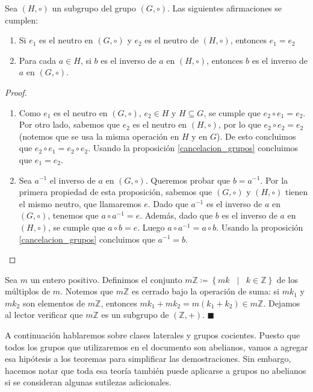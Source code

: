 \begin{proposition}
Sea $(H, \circ)$ un subgrupo del grupo $(G, \circ)$. Las siguientes afirmaciones se cumplen:
	\begin{enumerate}
		\item Si $e_1$ es el neutro en $(G, \circ)$ y $e_2$ es el neutro de $(H, \circ)$, entonces $e_1 = e_2$

		\item Para cada $a \in H$, si $b$ es el inverso de $a$ en $(H, \circ)$, entonces $b$ es el inverso de $a$ en $(G, \circ)$.
	\end{enumerate}
\end{proposition}


\begin{proof} \text{ }
\begin{enumerate}
\item Como $e_1$ es el neutro en $(G, \circ)$, $e_2\in H$ y $H \subseteq G$, se cumple que $e_2 \circ e_1 = e_2$.
Por otro lado, sabemos que $e_2$ es el neutro en $(H, \circ)$, por lo que $e_2 \circ e_2 = e_2$
(notemos que se usa la misma operación en $H$ y en $G$).
De esto concluimos que $e_2 \circ e_1 = e_2 \circ e_2$. Usando la proposición \ref{cancelacion_grupos} concluimos que $e_1 = e_2$.
\item Sea $a^{-1}$ el inverso de $a$ en $(G, \circ)$. Queremos probar que $b = a^{-1}$. Por la primera propiedad de esta proposición, sabemos que $(G, \circ)$ y $(H,
\circ)$ tienen el mismo neutro, que llamaremos $e$. 
Dado que $a^{-1}$ es el inverso de $a$ en $(G, \circ)$, tenemos que $a \circ a^{-1} = e$. Además, dado que $b$ es el inverso de $a$ en $(H, \circ)$, se cumple que $a \circ b = e$. Luego $a \circ a^{-1} = a \circ b$. Usando la proposición \ref{cancelacion_grupos} concluimos que $a^{-1} = b$.
\end{enumerate}
\end{proof}

\begin{example} \label{ejemplo_subgrupo}
Sea $m$ un entero positivo. Definimos el conjunto
$m\mathbb{Z} \coloneq \left\{mk \;\; \mid \;\; k \in \mathbb{Z}\right\}$ de los múltiplos de $m$. Notemos que $m\mathbb{Z}$ es cerrado bajo la operación de suma: si $mk_1$ y $mk_2$ son elementos de $m\mathbb{Z}$, entonces $mk_1 + mk_2 = m(k_1 + k_2) \in m\mathbb{Z}$. Dejamos al lector verificar que $m\mathbb{Z}$ es un subgrupo de $(\mathbb{Z}, +)$. \hfill$\blacksquare$
\end{example}


A continuación hablaremos sobre clases laterales y grupos cocientes. Puesto que todos los grupos que utilizaremos en el documento son abelianos, vamos a agregar esa hipótesis a los teoremas para simplificar las demostraciones. Sin embargo, hacemos notar que toda esa teoría también puede aplicarse a grupos no abelianos si se consideran algunas sutilezas adicionales. 

